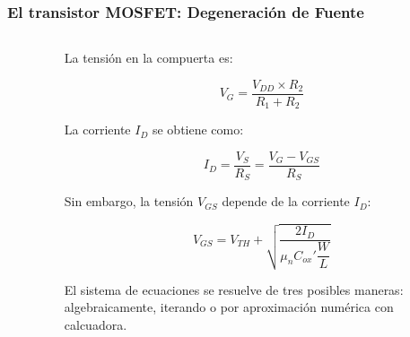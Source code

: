 \begin{frame}[t]
    \frametitle{El transistor MOSFET: Degeneración de Fuente}

    \begin{columns}
        \begin{column}{0.5\textwidth}
            \begin{figure}[H]
                \centering
            \end{figure}
        \end{column}
        \begin{column}{0.5\textwidth}
            La tensión en la compuerta es:

            \[ V_G = \dfrac{V_{DD} \times R_2}{R_1 + R_2} \]

            La corriente $I_D$ se obtiene como:

            \[ I_D = \dfrac{V_S}{R_S} = \dfrac{V_G - V_{GS}}{R_S} \]

            Sin embargo, la tensión $V_{GS}$ depende de la corriente $I_D$:

            \[ V_{GS} = V_{TH} + \sqrt{\dfrac{2I_D}{\mu_n C_{ox}' \dfrac{W}{L}}} \]

            El sistema de ecuaciones se resuelve de tres posibles maneras: algebraicamente, iterando o por aproximación numérica con calcuadora.
        \end{column}
    \end{columns}
\end{frame}



